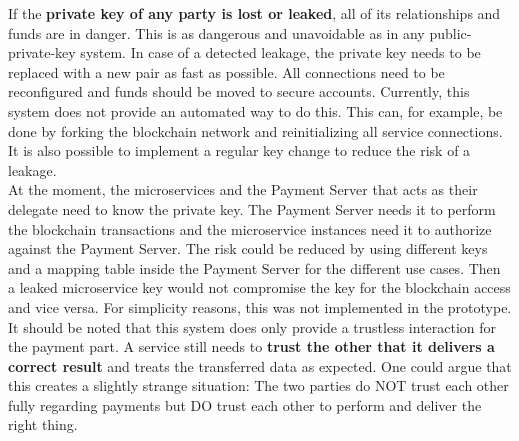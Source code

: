 \documentclass[a4paper,12pt]{scrartcl}
\begin{document}
If the \textbf{private key of any party is lost or leaked}, all of its relationships and funds are in danger. This is as dangerous and unavoidable as in any public-private-key system. In case of a detected leakage, the private key needs to be replaced with a new pair as fast as possible. All connections need to be reconfigured and funds should be moved to secure accounts. Currently, this system does not provide an automated way to do this. This can, for example, be done by forking the blockchain network and reinitializing all service connections. It is also possible to implement a regular key change to reduce the risk of a leakage.\\
At the moment, the microservices and the Payment Server that acts as their delegate need to know the private key. The Payment Server needs it to perform the blockchain transactions and the microservice instances need it to authorize against the Payment Server. The risk could be reduced by using different keys and a mapping table inside the Payment Server for the different use cases. Then a leaked microservice key would not compromise the key for the blockchain access and vice versa. For simplicity reasons, this was not implemented in the prototype.\\

It should be noted that this system does only provide a trustless interaction for the payment part. A service still needs to \textbf{trust the other that it delivers a correct result} and treats the transferred data as expected. One could argue that this creates a slightly strange situation: The two parties do NOT trust each other fully regarding payments but DO trust each other to perform and deliver the right thing.\\
\end{document}
